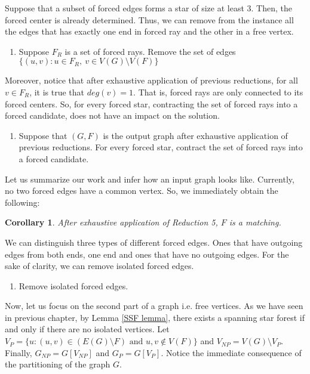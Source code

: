 \documentclass[en]{pracamgr}
\newtheorem{corollary}{Corollary}
\begin{document}
Suppose that a subset of forced edges forms a star of size at least $3$. Then, the forced center is already determined. Thus, we can remove from the instance all the edges that has exactly one end in forced ray and the other in a free vertex. 

\begin{enumerate}[leftmargin=*,label=\textbf{Reduction \arabic{enumi}},resume,wide, labelwidth=!, labelindent=0pt]
	\item Suppose $F_R$ is a set of forced rays. Remove the set of edges $\{(u,v): u \in F_R,\ v \in V(G) \setminus V(F)\}$
\end{enumerate}

Moreover, notice that after exhaustive application of previous reductions, for all $v \in F_R$, it is true that $deg(v)=1$. That is, forced rays are only connected to its forced centers. So, for every forced star, contracting the set of forced rays into a forced candidate, does not have an impact on the solution.

\begin{enumerate}[leftmargin=*,label=\textbf{Reduction \arabic{enumi}},resume,wide, labelwidth=!, labelindent=0pt]
	\item Suppose that $(G,F)$ is the output graph after exhaustive application of previous reductions. For every forced star, contract the set of forced rays into a forced candidate.
\end{enumerate}

Let us summarize our work and infer how an input graph looks like. Currently, no two forced edges have a common vertex. So, we immediately obtain the following:

\begin{corollary}
	After exhaustive application of Reduction 5, $F$ is a matching.
\end{corollary}

We can distinguish three types of different forced edges. Ones that have outgoing edges from both ends, one end and ones that have no outgoing edges. For the sake of clarity, we can remove isolated forced edges.

\begin{enumerate}[leftmargin=*,label=\textbf{Reduction \arabic{enumi}},resume,wide, labelwidth=!, labelindent=0pt]
	\item Remove isolated forced edges.
\end{enumerate}

Now, let us focus on the second part of a graph i.e. free vertices. As we have seen in previous chapter, by Lemma \ref{SSF lemma}, there exists a spanning star forest if and only if there are no isolated vertices. Let $V_P = \{u: (u,v) \in (E(G) \setminus F) \text{ and } u,v \notin V(F)\}$ and $V_{NP} = V(G) \setminus V_P$. Finally, $G_{NP} = G[V_{NP}]$ and $G_P = G[V_P]$. Notice the immediate consequence of the partitioning of the graph $G$.
\end{document}
